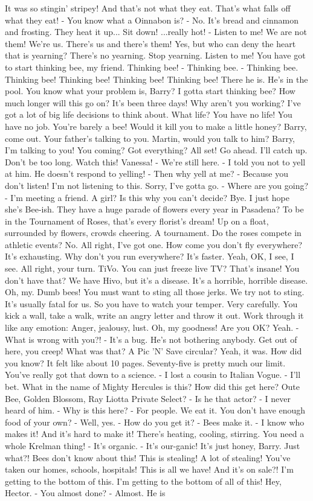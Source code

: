 \documentclass{article}
\begin{document}
It was so stingin' stripey! And that's not what they eat. That's what falls off what they eat! - You know what a Oinnabon is? - No. It's bread and cinnamon and frosting. They heat it up... Sit down! ...really hot! - Listen to me! We are not them! We're us. There's us and there's them! Yes, but who can deny the heart that is yearning? There's no yearning. Stop yearning. Listen to me! You have got to start thinking bee, my friend. Thinking bee! - Thinking bee. - Thinking bee. Thinking bee! Thinking bee! Thinking bee! Thinking bee! There he is. He's in the pool. You know what your problem is, Barry? I gotta start thinking bee? How much longer will this go on? It's been three days! Why aren't you working? I've got a lot of big life decisions to think about. What life? You have no life! You have no job. You're barely a bee! Would it kill you to make a little honey? Barry, come out. Your father's talking to you. Martin, would you talk to him? Barry, I'm talking to you! You coming? Got everything? All set! Go ahead. I'll catch up. Don't be too long. Watch this! Vanessa! - We're still here. - I told you not to yell at him. He doesn't respond to yelling! - Then why yell at me? - Because you don't listen! I'm not listening to this. Sorry, I've gotta go. - Where are you going? - I'm meeting a friend. A girl? Is this why you can't decide? Bye. I just hope she's Bee-ish. They have a huge parade of flowers every year in Pasadena? To be in the Tournament of Roses, that's every florist's dream! Up on a float, surrounded by flowers, crowds cheering. A tournament. Do the roses compete in athletic events? No. All right, I've got one. How come you don't fly everywhere? It's exhausting. Why don't you run everywhere? It's faster. Yeah, OK, I see, I see. All right, your turn. TiVo. You can just freeze live TV? That's insane! You don't have that? We have Hivo, but it's a disease. It's a horrible, horrible disease. Oh, my. Dumb bees! You must want to sting all those jerks. We try not to sting. It's usually fatal for us. So you have to watch your temper. Very carefully. You kick a wall, take a walk, write an angry letter and throw it out. Work through it like any emotion: Anger, jealousy, lust. Oh, my goodness! Are you OK? Yeah. - What is wrong with you?! - It's a bug. He's not bothering anybody. Get out of here, you creep! What was that? A Pic 'N' Save circular? Yeah, it was. How did you know? It felt like about 10 pages. Seventy-five is pretty much our limit. You've really got that down to a science. - I lost a cousin to Italian Vogue. - I'll bet. What in the name of Mighty Hercules is this? How did this get here? Oute Bee, Golden Blossom, Ray Liotta Private Select? - Is he that actor? - I never heard of him. - Why is this here? - For people. We eat it. You don't have enough food of your own? - Well, yes. - How do you get it? - Bees make it. - I know who makes it! And it's hard to make it! There's heating, cooling, stirring. You need a whole Krelman thing! - It's organic. - It's our-ganic! It's just honey, Barry. Just what?! Bees don't know about this! This is stealing! A lot of stealing! You've taken our homes, schools, hospitals! This is all we have! And it's on sale?! I'm getting to the bottom of this. I'm getting to the bottom of all of this! Hey, Hector. - You almost done? - Almost. He is 
\end{document}
